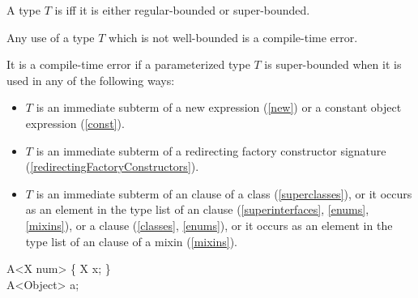 \documentclass[makeidx]{article}
\begin{document}

\LMHash{}%
A type $T$ is  if{}f
it is either regular-bounded or super-bounded.

\LMHash{}%
Any use of a type $T$ which is not well-bounded is a compile-time error.

\LMHash{}%
It is a compile-time error if a parameterized type $T$ is super-bounded
when it is used in any of the following ways:

\begin{itemize}
\item $T$ is an immediate subterm of a new expression
  (\ref{new})
  or a constant object expression
  (\ref{const}).
\item $T$ is an immediate subterm of a redirecting factory constructor
  signature
 (\ref{redirectingFactoryConstructors}).
\item $T$ is an immediate subterm of an \EXTENDS{} clause of a class
  (\ref{superclasses}),
  or it occurs as an element in the type list of an \IMPLEMENTS{} clause
  (\ref{superinterfaces}, \ref{enums}, \ref{mixins}),
  or a \WITH{} clause
  (\ref{classes}, \ref{enums}),
  or it occurs as an element in the type list of an \ON{} clause of a mixin
  (\ref{mixins}).
\end{itemize}



\begin{dartCode}
\CLASS{} A<X \EXTENDS{} num> \{
  X x;
\}
\\
A<Object> a;
\end{dartCode}

\end{document}
